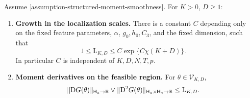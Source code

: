 \begin{lemma}
\label{lem:conditional-local-coefficient-growth}
Assume \cref{assumption-structured-moment-smoothness}. For $K>0$, $D\ge1$:
\begin{enumerate}[label=(\roman*),leftmargin=*]
\item \textbf{Growth in the localization scales.} There is a constant $C$
depending only on the fixed feature parameters, $\alpha$, $g_0,h_0,C_3$,
and the fixed dimension, such that
\begin{equation}
\label{eq:local-envelope-growth}
 1\le\mathrm L_{K,D}\le C\exp\{C\chi(K+D)\}.
\end{equation}
In particular $C$ is independent of $K,D,N,T,p$.
\item \textbf{Moment derivatives on the feasible region.} For
$\theta\in\mathcal V_{K,D}$,
\begin{equation}
\label{eq:local-moment-derivative-bound}
 \|\mathrm{D} G(\theta)\|_{\mathsf H_a\to\mathbb R}
 \vee\|\mathrm{D}^2G(\theta)\|_{\mathsf H_a\times\mathsf H_a\to\mathbb R}
 \le\mathrm L_{K,D}.
\end{equation}
\end{enumerate}
\end{lemma}
